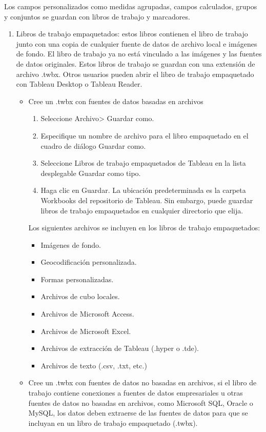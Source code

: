 \documentclass[
]{book}
\providecommand{\tightlist}{%
  \setlength{\itemsep}{0pt}\setlength{\parskip}{0pt}}
\begin{document}
Los campos personalizados como medidas agrupadas, campos calculados, grupos y conjuntos se guardan con libros de trabajo y marcadores.

\begin{enumerate}
\def\labelenumi{\arabic{enumi}.}
\setcounter{enumi}{4}
\tightlist
\item
  Libros de trabajo empaquetados: estos libros contienen el libro de trabajo junto con una copia de cualquier fuente de datos de archivo local e imágenes de fondo. El libro de trabajo ya no está vinculado a las imágenes y las fuentes de datos originales. Estos libros de trabajo se guardan con una extensión de archivo .twbx. Otros usuarios pueden abrir el libro de trabajo empaquetado con Tableau Desktop o Tableau Reader.

  \begin{itemize}
  \tightlist
  \item
    Cree un .twbx con fuentes de datos basadas en archivos

    \begin{enumerate}
    \def\labelenumii{\arabic{enumii}.}
    \tightlist
    \item
      Seleccione Archivo\textgreater{} Guardar como.
    \item
      Especifique un nombre de archivo para el libro empaquetado en el
      cuadro de diálogo Guardar como.
    \item
      Seleccione Libros de trabajo empaquetados de Tableau en la lista
      desplegable Guardar como tipo.
    \item
      Haga clic en Guardar.
      La ubicación predeterminada es la carpeta Workbooks del repositorio de Tableau. Sin embargo, puede guardar libros de trabajo empaquetados en cualquier directorio que elija.
    \end{enumerate}

    Los siguientes archivos se incluyen en los libros de trabajo empaquetados:

    \begin{itemize}
    \tightlist
    \item
      Imágenes de fondo.
    \item
      Geocodificación personalizada.
    \item
      Formas personalizadas.
    \item
      Archivos de cubo locales.
    \item
      Archivos de Microsoft Access.
    \item
      Archivos de Microsoft Excel.
    \item
      Archivos de extracción de Tableau (.hyper o .tde).
    \item
      Archivos de texto (.csv, .txt, etc.)
    \end{itemize}
  \item
    Cree un .twbx con fuentes de datos no basadas en archivos,
    si el libro de trabajo contiene conexiones a fuentes de datos
    empresariales u otras fuentes de datos no basadas en archivos, como
    Microsoft SQL, Oracle o MySQL, los datos deben extraerse de las fuentes de
    datos para que se incluyan en un libro de trabajo empaquetado (.twbx).


\end{itemize}
\end{enumerate}
\end{document}
